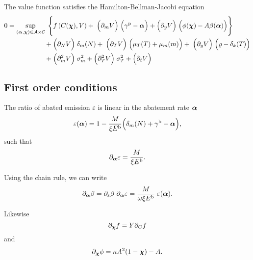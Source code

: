 \documentclass[../../main.tex]{subfiles}
\begin{document}
\begin{proposition}
    The value function satisfies the Hamilton-Bellman-Jacobi equation \begin{equation}
        \begin{split}
            0 = \sup_{(\bm{\alpha}, \bm{\chi}) \in \mathcal{A} \times \mathcal{C}} \; \Bigg\{ &f\left(C(\bm{\chi}), V\right) + \;
            \Big(\partial_{m} V \Big) \; \Big(\gamma^{\mathrm{p}} - \bm{\alpha} \Big) + \Big(\partial_{y} V \Big) \;  \Big(\phi(\bm{\chi}) - A \beta(\bm{\alpha}) \Big) \Bigg\} \\
            + \; &\Big(\partial_{N} V\Big) \; \delta_m(N) + \;
            \Big(\partial_T V \Big) \; \Big(\mu_T(T) + \mu_{m}(m) \Big) + \;
            \Big(\partial_{y} V \Big) \; \Big(\varrho - \delta_k(T) \Big) \\
            + \; &\Big(\partial^2_{m} V\Big) \; \sigma^2_m + \Big(\partial^2_{T} V\Big) \; \sigma^2_T + \Big(\partial_t V\Big)
        \end{split}
    \end{equation}
\end{proposition}

\subsection{First order conditions}

The ratio of abated emission $\varepsilon$ is linear in the abatement rate $\bm{\alpha}$ \begin{equation}
    \varepsilon(\bm{\alpha}) = 1 - \frac{M}{\xi E^{\mathrm{b}}} \Big(\delta_m(N) + \gamma^{\mathrm{b}} - \bm{\alpha}\Big),
\end{equation} such that \begin{equation}
    \partial_{\bm{\alpha}} \varepsilon = \frac{M}{\xi E^{\mathrm{b}}}.
\end{equation}

Using the chain rule, we can write \begin{equation}
    \partial_{\bm{\alpha}} \beta = \partial_{\varepsilon} \beta \; \partial_{\bm{\alpha}} \varepsilon = \frac{M}{\omega \xi E^{\mathrm{b}}} \; \varepsilon(\bm{\alpha}).
\end{equation}

Likewise \begin{equation}
    \partial_{\bm{\chi}} f = Y \partial_{C} f
\end{equation} and \begin{equation}
    \partial_{\bm{\chi}} \phi = \kappa A^2 (1 - \bm{\chi}) - A.
\end{equation}
\end{document}

